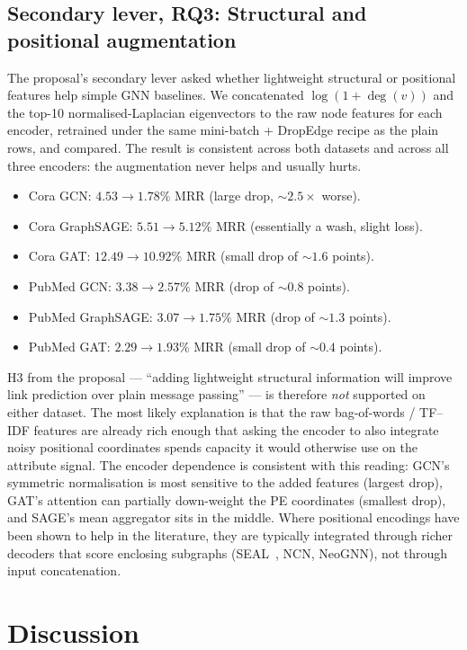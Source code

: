 \documentclass[10pt,a4paper]{article}
\begin{document}
\subsection{Secondary lever, RQ3: Structural and positional augmentation}
The proposal's secondary lever asked whether lightweight structural or
positional features help simple GNN baselines. We concatenated
$\log(1 + \deg(v))$ and the top-10 normalised-Laplacian eigenvectors to
the raw node features for each encoder, retrained under the same
mini-batch + DropEdge recipe as the plain rows, and compared. The result is consistent across both datasets and across all three
encoders: the augmentation never helps and usually hurts.
\begin{itemize}
\item Cora GCN: $4.53 \to 1.78\%$ MRR (large drop, $\sim 2.5\times$ worse).
\item Cora GraphSAGE: $5.51 \to 5.12\%$ MRR (essentially a wash, slight loss).
\item Cora GAT: $12.49 \to 10.92\%$ MRR (small drop of $\sim 1.6$ points).
\item PubMed GCN: $3.38 \to 2.57\%$ MRR (drop of $\sim 0.8$ points).
\item PubMed GraphSAGE: $3.07 \to 1.75\%$ MRR (drop of $\sim 1.3$ points).
\item PubMed GAT: $2.29 \to 1.93\%$ MRR (small drop of $\sim 0.4$ points).
\end{itemize}
H3 from the proposal --- ``adding lightweight structural information
will improve link prediction over plain message passing'' --- is
therefore \emph{not} supported on either dataset. The most likely
explanation is that the raw bag-of-words / TF--IDF features are
already rich enough that asking the encoder to also integrate noisy
positional coordinates spends capacity it would otherwise use on the
attribute signal. The encoder dependence is consistent with this
reading: GCN's symmetric normalisation is most sensitive to the added
features (largest drop), GAT's attention can partially down-weight the
PE coordinates (smallest drop), and SAGE's mean aggregator sits in the
middle. Where positional encodings have been shown to help in the
literature, they are typically integrated through richer decoders that
score enclosing subgraphs (SEAL~\cite{zhang2018link}, NCN, NeoGNN),
not through input concatenation.

\section{Discussion}
\end{document}
